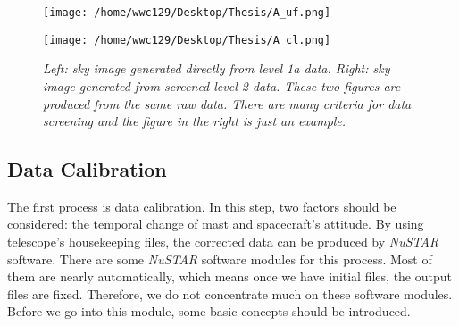 \documentclass[12pt]{report}
\begin{document}
            \begin{figure}[h] 
            \vspace{0.2cm}
                \begin{minipage}{0.45\textwidth}
                \begin{flushright} 
                \texttt{[image: /home/wwc129/Desktop/Thesis/A\_uf.png]}
            \end{flushright}
            \end{minipage}
            \hspace{1cm}
            \begin{minipage}{0.45\textwidth}
              \begin{flushleft}
                \texttt{[image: /home/wwc129/Desktop/Thesis/A\_cl.png]}
              \end{flushleft} 
            \end{minipage}
            \centering
            \begin{minipage}[c]{0.85\textwidth}
                \caption{\textit{\footnotesize Left: sky image generated directly from level 1a data. Right: sky 
                image 
                generated from screened level 2 data. These two figures are produced from the same raw data. 
                There are 
                many criteria for data screening and the figure in the right is just an example.}}
                \label{fig:comparison}
            \end{minipage}
            \end{figure}
            
            \subsection{Data Calibration}   
                The first process is data calibration. In this step, two factors should be considered: the temporal 
                change 
                of mast and spacecraft's attitude. By using telescope's housekeeping files, the corrected data can be 
                produced by \textit{NuSTAR} software. There are some \textit{NuSTAR} software modules for this 
                process. Most of them are 
                nearly automatically, which means once we have initial files, the output files are fixed. 
                Therefore, we 
                do not concentrate much on these software modules. Before we go into this module, some basic 
                concepts should be introduced.
\end{document}
